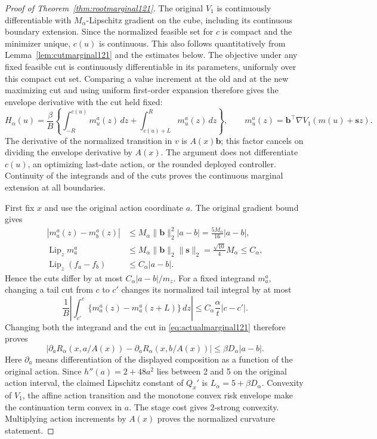 \begin{proof}[Proof of Theorem~\ref{thm:rootmarginal121}]
The original \(V_1\) is continuously differentiable with
\(M_\alpha\)-Lipschitz gradient on the cube, including its
continuous boundary extension.  Since the normalized feasible
set for \(c\) is compact and the minimizer unique, \(c(u)\) is
continuous.  This also follows quantitatively from
Lemma~\ref{lem:cutmarginal121} and the estimates below.
The objective under any fixed feasible cut is continuously
differentiable in its parameters, uniformly over this compact
cut set.  Comparing a value increment at the old and at the
new maximizing cut and using uniform first-order expansion
therefore gives the envelope derivative with the cut held
fixed:
\begin{equation}\label{eq:actualmarginal121}
 H_\alpha(u)=\frac{\beta}{B}
       \left\{\int_{-R}^{c(u)}m_u^a(z)\,dz
                +\int_{c(u)+L}^{R}m_u^a(z)\,dz\right\},
 \qquad
 m_u^a(z)=\boldsymbol b^\top
                   \nabla V_1(m(u)+\boldsymbol s z).
\end{equation}
The derivative of the normalized transition in \(v\) is
\(A(x)\boldsymbol b\); this factor cancels on dividing the
envelope derivative by \(A(x)\).
The argument does not differentiate \(c(u)\), an optimizing
last-date action, or the rounded deployed controller.
Continuity of the integrands and of the cuts proves the
continuous marginal extension at all boundaries.

First fix \(x\) and use the original action coordinate \(a\).
The original gradient bound gives
\begin{align*}
 |m_a^a(z)-m_b^a(z)|
       &\leq M_\alpha\|\boldsymbol b\|_2^2|a-b|
         =\frac{5M_\alpha}{16}|a-b|,\\
 \operatorname{Lip}_z m_a^a
       &\leq M_\alpha\|\boldsymbol b\|_2
                          \|\boldsymbol s\|_2
         =\frac{\sqrt{10}}4M_\alpha\leq C_\alpha,\\
 \operatorname{Lip}_z(f_a-f_b)
       &\leq C_\alpha|a-b|.
\end{align*}
Hence the cuts differ by at most
\(C_\alpha|a-b|/m_z\).
For a fixed integrand \(m_a^a\), changing a tail cut from
\(c\) to \(c'\) changes its normalized tail integral by at most
\[
 \frac1B\left|\int_{c'}^c
            \{m_a^a(z)-m_a^a(z+L)\}\,dz\right|
 \leq C_\alpha\frac{\alpha}{t}|c-c'|.
\]
Changing both the integrand and the cut in
\eqref{eq:actualmarginal121} therefore proves
\[
 |\partial_a R_\alpha(x,a/A(x))
       -\partial_a R_\alpha(x,b/A(x))|
 \leq\beta D_\alpha|a-b|.
\]
Here \(\partial_a\) means differentiation of the displayed
composition as a function of the original action.
Since \(h''(a)=2+48a^2\) lies between 2 and 5 on the original
action interval, the claimed Lipschitz constant of \(Q_x'\)
is \(L_\alpha=5+\beta D_\alpha\).
Convexity of \(V_1\), the affine action transition and the
monotone convex risk envelope make the continuation term
convex in \(a\).  The stage cost gives \(2\)-strong convexity.
Multiplying action increments by \(A(x)\) proves the
normalized curvature statement.


\end{proof}
